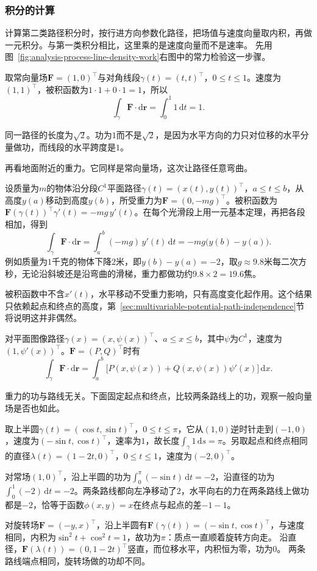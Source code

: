 \subsubsection{积分的计算}

计算第二类路径积分时，按行进方向参数化路径，把场值与速度向量取内积，再做一元积分。与第一类积分相比，这里乘的是速度向量而不是速率。
先用图~\ref{fig:analysis-process-line-density-work}右图中的常力检验这一步骤。
\begin{example}[常力沿对角线段做功]
取常向量场$\bm F=(1,0)^\top$与对角线段$\gamma(t)=(t,t)^\top$，$0\leq t\leq1$。速度为$(1,1)^\top$，被积函数为$1\cdot1+0\cdot1=1$，所以
\[
 \int_\gamma\bm F\cdot\mathrm d\bm r=\int_0^1 1\,\mathrm dt=1.
\]
\end{example}
同一路径的长度为$\sqrt2$。功为$1$而不是$\sqrt2$，是因为水平方向的力只对位移的水平分量做功，而线段的水平跨度是$1$。

再看地面附近的重力。它同样是常向量场，这次让路径任意弯曲。
\begin{example}[重力做功只取决于高度差]
\label{ex:analysis-gravity-work}
设质量为$m$的物体沿分段$C^1$平面路径$\gamma(t)=(x(t),y(t))^\top$，$a\leq t\leq b$，从高度$y(a)$移动到高度$y(b)$，所受重力为$\bm F=(0,-mg)^\top$。被积函数为$\bm F(\gamma(t))^\top\gamma'(t)=-mg\,y'(t)$。在每个光滑段上用一元基本定理，再把各段相加，得到
\[
 \int_\gamma\bm F\cdot\mathrm d\bm r
 =\int_a^b(-mg)\,y'(t)\,\mathrm dt=-mg\bigl(y(b)-y(a)\bigr).
\]
例如质量为$1$千克的物体下降$2$米，即$y(b)-y(a)=-2$，取$g\approx9.8$米每二次方秒，无论沿斜坡还是沿弯曲的滑梯，重力都做功约$9.8\times2=19.6$焦。
\end{example}
被积函数中不含$x'(t)$，水平移动不受重力影响，只有高度变化起作用。这个结果只依赖起点和终点的高度，第~\ref{sec:multivariable-potential-path-independence}节将说明这并非偶然。

对平面图像路径$\gamma(x)=(x,\psi(x))^\top$、$a\leq x\leq b$，其中$\psi$为$C^1$，速度为$(1,\psi'(x))^\top$。$\bm F=(P,Q)^\top$时有
\[
 \int_\gamma\bm F\cdot\mathrm d\bm r
 =\int_a^b\bigl[P(x,\psi(x))+Q(x,\psi(x))\psi'(x)\bigr]\,\mathrm dx.
\]

重力的功与路线无关。下面固定起点和终点，比较两条路线上的功，观察一般向量场是否也如此。
\begin{example}[半圆和直径]
\label{ex:analysis-path-integral-comparison}
取上半圆$\gamma(t)=(\cos t,\sin t)^\top$，$0\leq t\leq\pi$，它从$(1,0)$逆时针走到$(-1,0)$，速度为$(-\sin t,\cos t)^\top$，速率为$1$，故长度$\int_\gamma1\,\mathrm ds=\pi$。另取起点和终点相同的直径$\lambda(t)=(1-2t,0)^\top$，$0\leq t\leq1$，速度为$(-2,0)^\top$。

对常场$(1,0)^\top$，沿上半圆的功为$\int_0^\pi(-\sin t)\,\mathrm dt=-2$，沿直径的功为$\int_0^1(-2)\,\mathrm dt=-2$。两条路线都向左净移动了$2$，水平向右的力在两条路线上做功都是$-2$，恰等于函数$\phi(x,y)=x$在终点与起点的差$-1-1$。

对旋转场$\bm F=(-y,x)^\top$，沿上半圆有$\bm F(\gamma(t))=(-\sin t,\cos t)^\top$，与速度相同，内积为$\sin^2t+\cos^2t=1$，故功为$\pi$：质点一直顺着旋转方向走。
沿直径，$\bm F(\lambda(t))=(0,1-2t)^\top$竖直，而位移水平，内积恒为零，功为$0$。
两条路线端点相同，旋转场做的功却不同。
\end{example}

